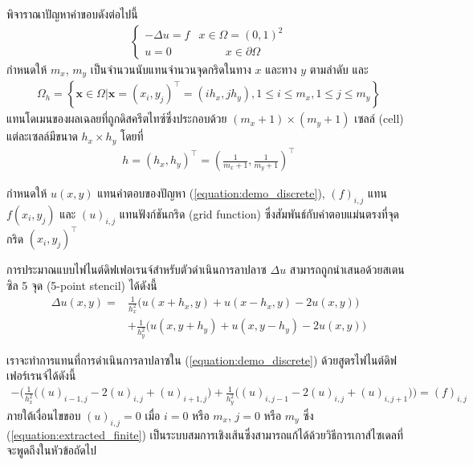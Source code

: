 \begin{Example}
    พิจาราณาปัญหาค่าขอบดังต่อไปนี้
    \begin{align}
        \left \{ \begin{array}{ll}   -\Delta u = f & x \in \Omega =	(0,1)^2	 \\
        u = 0 & \hspace{1cm} x \in \partial \Omega \end{array} \right . 
        \label{equation:demo_discrete}
    \end{align}
    \hspace{1cm} กำหนดให้ $m_x$, $m_y$ เป็นจำนวนนับแทนจำนวนจุดกริดในทาง $x$ และทาง $y$ ตามลำดับ และ
    \begin{align*}
        \Omega_{h}=\left\{ \mathbf{x} \in \Omega | \mathbf{x}=(x_i,y_j)^{\top} = (ih_x,jh_y), 1 \leq i \leq m_x, 1 \leq j \leq m_y  \right\}
    \end{align*}
    แทนโดเมนของผลเฉลยที่ถูกดิสครีตไทซ์ซึ่งประกอบด้วย $(m_x+1) \times (m_y+1)$ เซลล์ (cell) แต่ละเซลล์มีขนาด $h_x \times h_y$ โดยที่
    \begin{align*}
        h = (h_x,h_y)^{\top} = (\frac{1}{m_x+1},\frac{1}{m_y+1})^{\top}
    \end{align*}

    \hspace{1cm} กำหนดให้ $u(x,y)$ แทนคำตอบของปัญหา (\ref{equation:demo_discrete}), $(f)_{i,j}$ แทน $f(x_i,y_j)$ และ $(u)_{i,j}$ แทนฟังก์ชันกริด (grid function) ซึ่งสัมพันธ์กับคำตอบแม่นตรงที่จุดกริด $(x_i,y_j)^{\top}$ 
    
    \hspace{1cm} การประมาณแบบไฟไนต์ดิฟเฟอเรนจ์สำหรับตัวดำเนินการลาปลาซ $\Delta u$ สามารถถูกนำเสนอด้วยสเตนซิล 5 จุด (5-point stencil) ได้ดังนี้
    \begin{align}
        \nonumber \Delta u(x,y) = &\frac{1}{h_x^2} \Big( u(x+h_x,y) + u(x-h_x,y) - 2 u(x,y) \Big) \\&+ \frac{1}{h_y^2} \Big( u(x,y+h_y) + u(x,y-h_y) - 2 u(x,y) \Big) 
        \label{equation:5point-stencil}
    \end{align}

    เราจะทำการแทนที่การดำเนินการลาปลาซใน  (\ref{equation:demo_discrete}) ด้วยสูตรไฟไนต์ดิฟเฟอร์เรนจ์ได้ดังนี้
    \begin{align}
        - \Big( \frac{1}{h_x^2} \big( (u)_{i-1,j} - 2(u)_{i,j} + (u)_{i+1,j}\big) + \frac{1}{h_y^2} \big( (u)_{i,j-1} - 2(u)_{i,j} + (u)_{i,j+1}\big) \Big) = (f)_{i,j}
        \label{equation:extracted_finite}
    \end{align}
    ภายใต้เงื่อนไขขอบ $(u)_{i,j} = 0$ เมื่อ $i = 0$ หรือ $m_x$, $j = 0$ หรือ $m_y$ ซึ่ง (\ref{equation:extracted_finite}) เป็นระบบสมการเชิงเส้นซึ่งสามารถแก้ได้ด้วยวิธีการเกาส์ไซเดลที่จะพูดถึงในหัวข้อถัดไป
\end{Example}